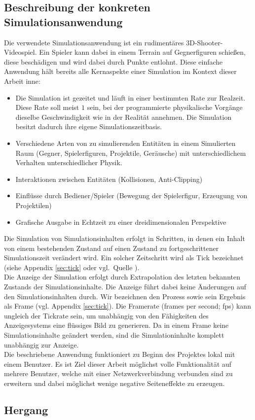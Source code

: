 \subsection{Beschreibung der konkreten Simulationsanwendung}
Die verwendete Simulationsanwendung ist ein rudimentäres 3D-Shooter-Videospiel. Ein Spieler kann dabei in einem Terrain auf Gegnerfiguren schießen, diese beschädigen und wird dabei durch Punkte entlohnt. Diese einfache Anwendung hält bereits alle Kernaspekte einer Simulation im Kontext dieser Arbeit inne:
\begin{itemize}
\item Die Simulation ist gezeitet und läuft in einer bestimmten Rate zur Realzeit. Diese Rate soll meist $1$ sein, bei der programmierte physikalische Vorgänge dieselbe Geschwindigkeit wie in der Realität annehmen. Die Simulation besitzt dadurch ihre eigene Simulationszeitbasis.
\item Verschiedene Arten von zu simulierenden Entitäten in einem Simulierten Raum (Gegner, Spielerfiguren, Projektile, Geräusche) mit unterschiedlichem Verhalten \/unterschiedlicher Physik.
\item Interaktionen zwischen Entitäten (Kollisionen, Anti-Clipping)
\item Einflüsse durch Bediener/Spieler (Bewegung der Spielerfigur, Erzeugung von Projektilen)
\item Grafische Ausgabe in Echtzeit zu einer dreidimensionalen Perspektive
\end{itemize}

Die Simulation von Simulationsinhalten erfolgt in Schritten, in denen ein Inhalt von einem bestehenden Zustand auf einen Zustand zu fortgeschrittener Simulationszeit verändert wird. Ein solcher Zeitschritt wird als Tick bezeichnet (siehe Appendix \ref{sec:tick} oder vgl.~Quelle \cite{tick}).\\
Die Anzeige der Simulation erfolgt durch Extrapolation des letzten bekannten Zustands der Simulationsinhalte. Die Anzeige führt dabei keine Änderungen auf den Simulationsinhalten durch. Wir bezeichnen den Prozess sowie sein Ergebnis als Frame (vgl. Appendix \ref{sec:tick}).
Die Framerate (frames per second; fps) kann ungleich der Tickrate sein, um unabhängig von den Fähigkeiten des Anzeigesystems eine flüssiges Bild zu generieren. Da in einem Frame keine Simulationsinhalte geändert werden, sind die Simulationinhalte komplett unabhängig zur Anzeige.\\

Die beschriebene Anwendung funktioniert zu Beginn des Projektes lokal mit einem Benutzer. Es ist Ziel dieser Arbeit möglichst volle Funktionalität auf mehrere Benutzer, welche mit einer Netzwerkverbindung verbunden sind zu erweitern und dabei möglichst wenige negative Seiteneffekte zu erzeugen.

\subsection{Hergang}
